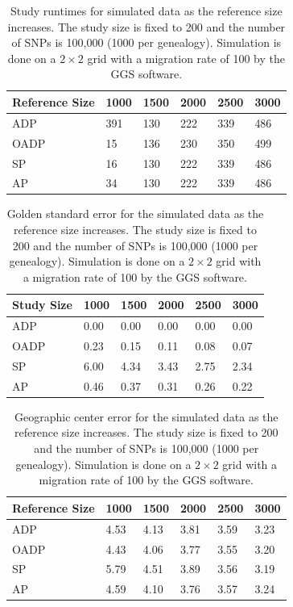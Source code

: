 \documentclass{article}
\begin{document}
\begin{table}
  \centering
  \begin{tabular}{|l|l|l|l|l|l|}
    \hline
    Reference Size & 1000 & 1500 & 2000 & 2500 & 3000 \\
    \hline
    ADP        & 391  &  130 &  222 &  339 &  486 \\
    OADP       & 15   &  136 &  230 &  350 &  499 \\
    SP         & 16   &  130 &  222 &  339 &  486 \\
    AP         & 34   &  130 &  222 &  339 &  486 \\
    \hline
  \end{tabular}
  \caption{
    Study runtimes for simulated data as the reference size increases.
    The study size is fixed to 200 and the number of SNPs is 100,000 (1000 per genealogy). 
    Simulation is done on a $2 \times 2$ grid with a migration rate of 100 by the GGS software. 
  }
  \label{tbl:nChg-runtimes-study}
\end{table}

\begin{table}
  \centering
  \begin{tabular}{|l|l|l|l|l|l|}
    \hline
    Study Size & 1000  & 1500 & 2000 & 2500 & 3000 \\
    \hline
    ADP        & 0.00  & 0.00 & 0.00 & 0.00 & 0.00 \\
    OADP       & 0.23  & 0.15 & 0.11 & 0.08 & 0.07 \\
    SP         & 6.00  & 4.34 & 3.43 & 2.75 & 2.34 \\
    AP         & 0.46  & 0.37 & 0.31 & 0.26 & 0.22 \\
    \hline
  \end{tabular}
  \caption{
    Golden standard error for the simulated data as the reference size increases.
    The study size is fixed to 200 and the number of SNPs is 100,000 (1000 per genealogy). 
    Simulation is done on a $2 \times 2$ grid with a migration rate of 100 by the GGS software. 
  }
  \label{tbl:nChg-accuracy-gold}
\end{table}

\begin{table}
  \centering
  \begin{tabular}{|l|l|l|l|l|l|}
    \hline
    Reference Size & 1000  & 1500 & 2000 & 2500 & 3000 \\
    \hline
    ADP        & 4.53  & 4.13 & 3.81 & 3.59 & 3.23 \\
    OADP       & 4.43  & 4.06 & 3.77 & 3.55 & 3.20 \\
    SP         & 5.79  & 4.51 & 3.89 & 3.56 & 3.19 \\
    AP         & 4.59  & 4.10 & 3.76 & 3.57 & 3.24 \\
    \hline
  \end{tabular}
  \caption{
    Geographic center error for the simulated data as the reference size increases.
    The study size is fixed to 200 and the number of SNPs is 100,000 (1000 per genealogy). 
    Simulation is done on a $2 \times 2$ grid with a migration rate of 100 by the GGS software. 
  }
  \label{tbl:nChg-accuracy-ctr}
\end{table}
\end{document}
